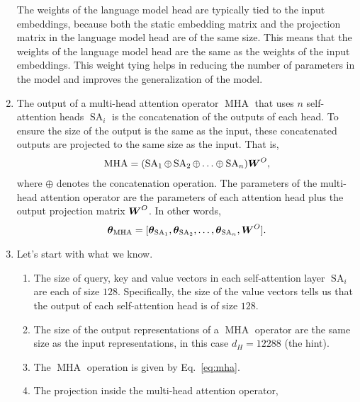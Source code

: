 \documentclass[11pt,a4paper]{article}
\newcommand\op[1]{\operatorname{#1}}
\begin{document}
\begin{enumerate}[label=(\alph*)]
          The weights of the language model head are typically tied to the
          input embeddings, because both the static embedding matrix and the
          projection matrix in the language model head are of the same size.
          This means that the weights of the language model head are the same
          as the weights of the input embeddings.
          This weight tying helps in reducing the number of parameters in the
          model and improves the generalization of the model.
    \item The output of a multi-head attention operator $\op{MHA}$ that uses $n$
          self-attention heads $\op{SA}_i$ is the concatenation of the outputs
          of each head.
          To ensure the size of the output is the same as the input, these
          concatenated outputs are projected to the same size as the input.
          That is,
          \begin{align}\label{eq:mha}
              \op{MHA} = (\op{SA}_1 \oplus \op{SA}_2 \oplus \ldots \oplus \op{SA}_n)\mW^O,
          \end{align}
          where $\oplus$ denotes the concatenation operation.
          The parameters of the multi-head attention operator are the
          parameters of each attention head plus the output projection matrix
          ${\boldsymbol{W}}^O$.
          In other words,
          \begin{align}
              \vtheta_{\op{MHA}} = [\vtheta_{\op{SA}_1}, \vtheta_{\op{SA}_2}, \ldots, \vtheta_{\op{SA}_n}, \mW^O].
          \end{align}
    \item Let's start with what we know.
          \begin{enumerate}[label=(\roman*)]
              \item The size of query, key and value vectors in each
                    self-attention layer $\op{SA}_i$ are each of size $128$.
                    Specifically, the size of the value vectors tells us that
                    the output of each self-attention head is of size $128$.
              \item The size of the output representations of a $\op{MHA}$
                    operator are the same size as the input representations, in
                    this case $d_H = 12288$ (the hint).
              \item The $\op{MHA}$ operation is given by Eq.~\ref{eq:mha}.
              \item The projection inside the multi-head attention operator,

\end{enumerate}
\end{enumerate}
\end{document}
